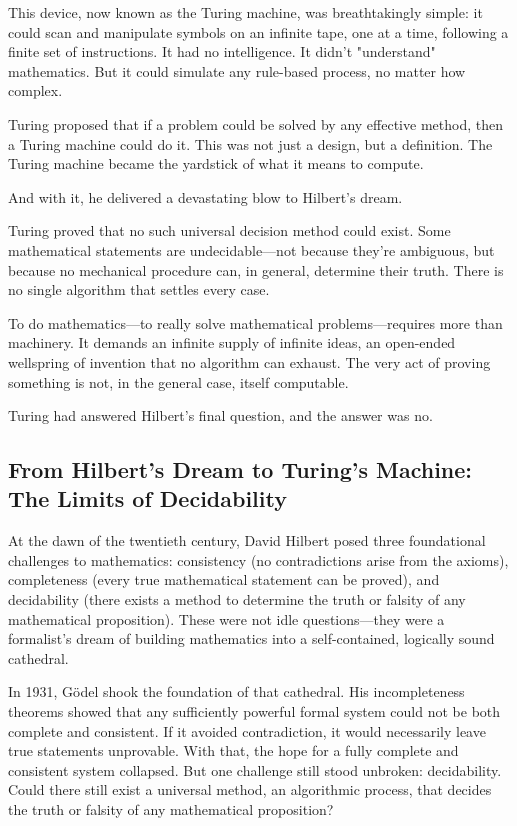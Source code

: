 This device, now known as the Turing machine, was breathtakingly simple: it could scan and manipulate symbols on an infinite tape, one at a time, following a finite set of instructions. It had no intelligence. It didn’t "understand" mathematics. But it could simulate any rule-based process, no matter how complex.

Turing proposed that if a problem could be solved by any effective method, then a Turing machine could do it. This was not just a design, but a definition. The Turing machine became the yardstick of what it means to compute.

And with it, he delivered a devastating blow to Hilbert’s dream.

Turing proved that no such universal decision method could exist. Some mathematical statements are undecidable—not because they’re ambiguous, but because no mechanical procedure can, in general, determine their truth. There is no single algorithm that settles every case.

To do mathematics—to really solve mathematical problems—requires more than machinery. It demands an infinite supply of infinite ideas, an open-ended wellspring of invention that no algorithm can exhaust. The very act of proving something is not, in the general case, itself computable.

Turing had answered Hilbert’s final question, and the answer was no.


\subsection{From Hilbert’s Dream to Turing’s Machine: The Limits of Decidability}

At the dawn of the twentieth century, David Hilbert posed three foundational challenges to mathematics: consistency (no contradictions arise from the axioms), completeness (every true mathematical statement can be proved), and decidability (there exists a method to determine the truth or falsity of any mathematical proposition). These were not idle questions—they were a formalist’s dream of building mathematics into a self-contained, logically sound cathedral.

In 1931, Gödel shook the foundation of that cathedral. His incompleteness theorems showed that any sufficiently powerful formal system could not be both complete and consistent. If it avoided contradiction, it would necessarily leave true statements unprovable. With that, the hope for a fully complete and consistent system collapsed. But one challenge still stood unbroken: decidability. Could there still exist a universal method, an algorithmic process, that decides the truth or falsity of any mathematical proposition?

